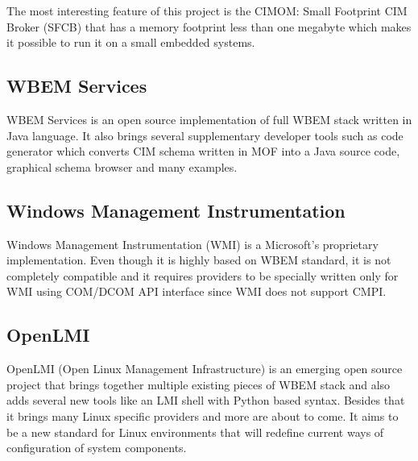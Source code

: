 The most interesting feature of this project is the CIMOM: Small Footprint CIM
Broker (SFCB) that has a memory footprint less than one megabyte which makes it
possible to run it on a small embedded systems.

\subsection{WBEM Services}
\label{wbem:implementations:wbemservices}

WBEM Services is an open source implementation of full WBEM stack written in
Java language. It also brings several supplementary developer tools such as code
generator which converts CIM schema written in MOF into a Java source code,
graphical schema browser and many examples.

\subsection{Windows Management Instrumentation}
\label{wbem:implementations:wmi}

Windows Management Instrumentation (WMI) is a Microsoft's proprietary
implementation. Even though it is highly based on WBEM standard, it is not
completely compatible and it requires providers to be specially written only for
WMI using COM/DCOM API interface since WMI does not support CMPI.

\subsection{OpenLMI}
\label{wbem:implementations:openlmi}

OpenLMI (Open Linux Management Infrastructure) is an emerging open source
project that brings together multiple existing pieces of WBEM stack and also
adds several new tools like an LMI shell with Python based syntax. Besides that
it brings many Linux specific providers and more are about to come. It aims to
be a new standard for Linux environments that will redefine current ways of
configuration of system components.
